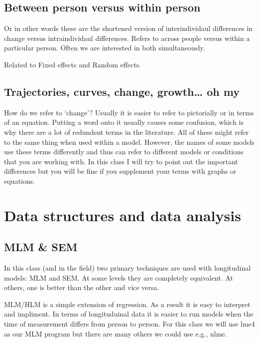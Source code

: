 \documentclass[]{book}
\begin{document}
\subsection{Between person versus within
person}\label{between-person-versus-within-person}

Or in other words these are the shortened version of interindividaul
differences in change versus intraindividaul differences. Refers to
across people versus within a particular person. Often we are interested
in both simultaneously.

Related to Fixed effects and Random effects.

\subsection{Trajectories, curves, change, growth\ldots{} oh
my}\label{trajectories-curves-change-growth-oh-my}

How do we refer to `change'? Usually it is easier to refer to
pictorially or in terms of an equation. Putting a word onto it usually
causes some confusion, which is why there are a lot of redundent terms
in the literature. All of these might refer to the same thing when used
within a model. However, the names of some models use these terms
differently and thus can refer to different models or conditions that
you are working with. In this class I will try to point out the
important differences but you will be fine if you supplement your terms
with graphs or equations.

\section{Data structures and data
analysis}\label{data-structures-and-data-analysis}

\subsection{MLM \& SEM}\label{mlm-sem}

In this class (and in the field) two primary techniques are used with
longitudinal models: MLM and SEM. At some levels they are completely
equivalent. At others, one is better than the other and vice versa.

MLM/HLM is a simple extension of regression. As a result it is easy to
interpret and impliment. In terms of longituduinal data it is easier to
run models when the time of measurement differs from person to person.
For this class we will use lme4 as our MLM program but there are many
others we could use e.g., nlme.
\end{document}
